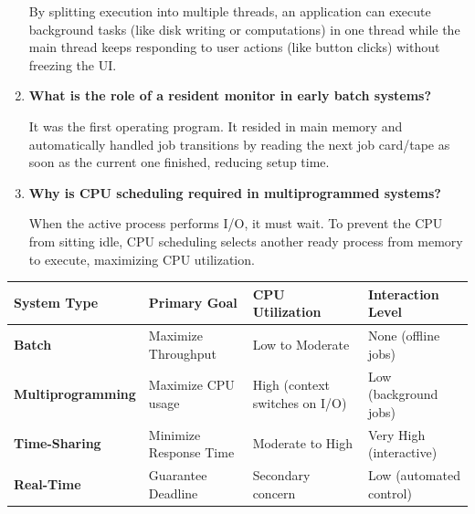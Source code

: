 \documentclass[12pt,a4paper]{article}
\newcommand{\Q}[1]{\textbf{#1}\par\noindent\ignorespaces}
\renewcommand{\arraystretch}{1.45}
\begin{document}
\begin{tcolorbox}[exambox, title={\textbf{Frequently Asked / Viva Questions}}]
\begin{enumerate}[topsep=0pt, label=\textbf{Q\arabic*.}, itemsep=5pt]
    By splitting execution into multiple threads, an application can execute background tasks (like disk writing or computations) in one thread while the main thread keeps responding to user actions (like button clicks) without freezing the UI.
  \item \Q{What is the role of a resident monitor in early batch systems?}
    It was the first operating program. It resided in main memory and automatically handled job transitions by reading the next job card/tape as soon as the current one finished, reducing setup time.
  \item \Q{Why is CPU scheduling required in multiprogrammed systems?}
    When the active process performs I/O, it must wait. To prevent the CPU from sitting idle, CPU scheduling selects another ready process from memory to execute, maximizing CPU utilization.
\end{enumerate}
\end{tcolorbox}

\begin{tcolorbox}[tikzbox, title={Comparative Analysis of Operating Systems}]
\renewcommand{\arraystretch}{1.4}
\par\noindent
\begin{tabularx}{\linewidth}{|B{3.5cm}|>{\small\centering\arraybackslash}X|>{\small\centering\arraybackslash}X|>{\small\centering\arraybackslash}X|}
\hline
\textbf{System Type} & \textbf{\color{myred}Primary Goal} & \textbf{\color{myteal}CPU Utilization} & \textbf{\color{myamber}Interaction Level} \\
\hline
\textbf{Batch} & Maximize Throughput & Low to Moderate & None (offline jobs) \\
\hline
\textbf{Multiprogramming} & Maximize CPU usage & High (context switches on I/O) & Low (background jobs) \\
\hline
\textbf{Time-Sharing} & Minimize Response Time & Moderate to High & Very High (interactive) \\
\hline
\textbf{Real-Time} & Guarantee Deadline & Secondary concern & Low (automated control) \\
\hline
\end{tabularx}
\end{tcolorbox}
\end{document}
